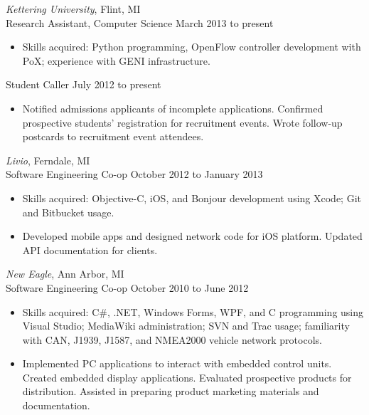 \documentclass{res}
\begin{document}
\begin{resume}
{\sl Kettering University}, Flint, MI \\
Research Assistant, Computer Science \hfill March 2013 to present

   \begin{itemize} \itemsep -2pt
   \item Skills acquired: Python programming, OpenFlow controller development
         with PoX; experience with GENI infrastructure.
   \end{itemize}
Student Caller \hfill July 2012 to present

   \begin{itemize} \itemsep -2pt
   \item Notified admissions applicants of incomplete applications.
         Confirmed prospective students' registration for recruitment events.
         Wrote follow-up postcards to recruitment event attendees.
   \end{itemize} 

   
{\sl Livio}, Ferndale, MI \\
Software Engineering Co-op       \hfill   October 2012 to January 2013
  
   \begin{itemize} \itemsep -2pt %
   \item Skills acquired: Objective-C, iOS, and Bonjour development using Xcode;
         Git and Bitbucket usage.
   \item Developed mobile apps and designed network code for iOS platform.
         Updated API documentation for clients. 
   \end{itemize}

{\sl New Eagle}, Ann Arbor, MI \\
Software Engineering Co-op \hfill October 2010 to June 2012

   \begin{itemize} \itemsep -2pt
   \item Skills acquired: C\#, .NET, Windows Forms, WPF, and C programming using
         Visual Studio; MediaWiki administration; SVN and Trac usage; 
         familiarity with CAN, J1939, J1587, and NMEA2000 vehicle network protocols.
   \item Implemented PC applications to interact with embedded control units.
         Created embedded display applications.
         Evaluated prospective products for distribution.
         Assisted in preparing product marketing materials and documentation.
   \end{itemize} 


\end{resume}
\end{document}
